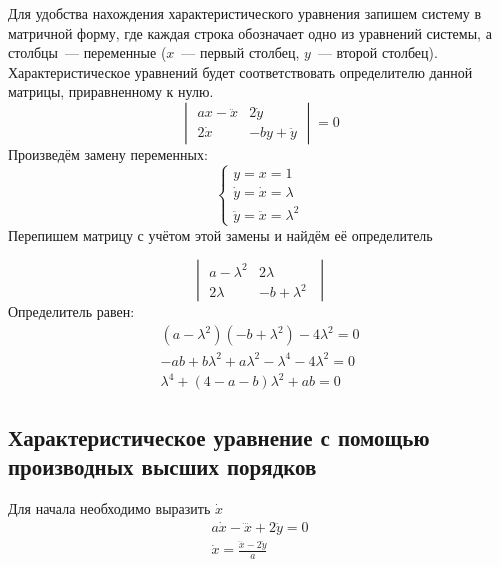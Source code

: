 \documentclass[12pt, a4paper]{article}
\begin{document}
    Для удобства нахождения характеристического уравнения запишем систему в матричной форму, где каждая строка обозначает одно из уравнений системы, а столбцы~--- переменные ($x$~---  первый столбец, $y$~--- второй столбец). Характеристическое уравнений будет соответствовать определителю данной матрицы, приравненному к нулю.\\

    \begin{displaymath}
        \begin{vmatrix}
            ax - \ddot x & 2 \dot y       \\
            2 \dot x     & - by + \ddot y
        \end{vmatrix}
        = 0
    \end{displaymath}
    Произведём замену переменных:
    \begin{equation*}
        \begin{cases}
            y = x = 1 \\
            \dot y = \dot x = \lambda \\
            \ddot y = \ddot x = \lambda^2
        \end{cases}
    \end{equation*}
    Перепишем матрицу с учётом этой замены и найдём её определитель

    \begin{equation*}
        \begin{vmatrix}
            a - \lambda^2 & 2 \lambda\;       \\
            2 \lambda     & - b + \lambda^2\;
        \end{vmatrix}
    \end{equation*}
    Определитель равен:
    \begin{align*}
    (a - \lambda^2)(- b + \lambda^2)
        - 4 \lambda^2 = 0\\
        - ab + b \lambda^2 + a \lambda^2 - \lambda^4 - 4 \lambda^2 = 0\\
        \boxed{
            \lambda^4 + (4 - a - b) \lambda^2 + ab = 0
        }
    \end{align*}

    \subsection{Характеристическое уравнение с помощью производных высших порядков}

    Для начала необходимо выразить $\dot x$
    \begin{gather*}
        a \dot x - \dddot x + 2 \ddot y = 0\\
        \dot x = \frac{\dddot x - 2 \ddot y}{a}
    \end{gather*}
\end{document}
